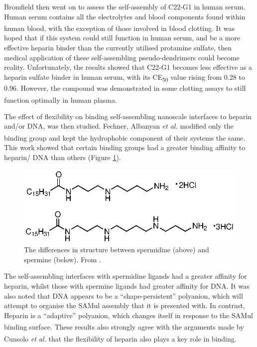 Bromfield then went on to assess the self-assembly of C22-G1 in human serum. Human serum contains all the electrolytes and blood components found within human blood, with the exception of those involved in blood clotting.\textsuperscript{\cite{Bromfield2014NanoscaleMedia}} It was hoped that if this system could still function in human serum, and be a more effective heparin binder than the currently utilised protamine sulfate, then medical application of these self-assembling pseudo-dendrimers could become reality.  Unfortunately, the results showed that C22-G1 becomes less effective as a heparin sulfate binder in human serum, with its CE\textsubscript{50} value rising from 0.28 to 0.96. However, the compound was demonstrated in some clotting assays to still function optimally in human plasma.\textsuperscript{\cite{Bromfield2014NanoscaleMedia}} 

The effect of flexibility on binding self-assembling nanoscale interfaces to heparin and/or DNA, was then studied. Fechner, Albanyan \textit{et al.} modified only the binding group and kept the hydrophobic component of their systems the same.\textsuperscript{\cite{Fechner2016ElectrostaticBinding}} This work showed that certain binding groups had a greater binding affinity to heparin/ DNA than others (Figure \ref{SPM_vs_SPD}). 
\begin{figure} [ht!]
\centering
\includegraphics[scale=0.9]{Figures/SPM_vs_SPD.eps}
\caption{The differences in structure between spermidine (above) and spermine (below). From \cite{Fechner2016ElectrostaticBinding}.}
\label{SPM_vs_SPD}
\end{figure}

The self-assembling interfaces with spermidine ligands had a greater affinity for heparin, whilst those with spermine ligands had greater affinity for DNA. It was also noted that DNA appears to be a “shape-persistent” polyanion, which will attempt to organise the SAMul assembly that it is presented with. In contrast, Heparin is a “adaptive” polyanion, which changes itself in response to the SAMul binding surface.\textsuperscript{\cite{Fechner2016ElectrostaticBinding}} These results also strongly agree with the arguments made by Cunsolo \textit{et al.} that the flexibility of heparin also plays a key role in binding.\textsuperscript{\cite{Mecca2006PolycationicHeparin}}

